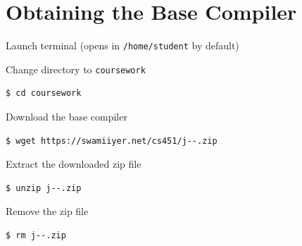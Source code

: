 \documentclass[8pt,a4paper,compress]{beamer}
\begin{document}
\section{Obtaining the Base \protect \jmm Compiler}
\begin{frame}[fragile]
\pause\transdissolve

Launch terminal (opens in \lstinline{/home/student} by default)

\pause\transdissolve\bigskip

Change directory to \lstinline{coursework}

\begin{tcolorbox}[enhanced,drop shadow southwest,sharp corners,size=fbox,colback=black]
\begin{lstlisting}[style=terminal]
$ cd coursework
\end{lstlisting}
\end{tcolorbox}

\pause\transdissolve\bigskip

Download the base \jmm compiler

\begin{tcolorbox}[enhanced,drop shadow southwest,sharp corners,size=fbox,colback=black]
\begin{lstlisting}[style=terminal]
$ wget https://swamiiyer.net/cs451/j--.zip
\end{lstlisting}
\end{tcolorbox}

\pause\transdissolve\bigskip

Extract the downloaded zip file

\begin{tcolorbox}[enhanced,drop shadow southwest,sharp corners,size=fbox,colback=black]
\begin{lstlisting}[style=terminal]
$ unzip j--.zip
\end{lstlisting}
\end{tcolorbox}

\pause\transdissolve\bigskip

Remove the zip file

\begin{tcolorbox}[enhanced,drop shadow southwest,sharp corners,size=fbox,colback=black]
\begin{lstlisting}[style=terminal]
$ rm j--.zip
\end{lstlisting}
\end{tcolorbox}
\end{frame}
\end{document}
